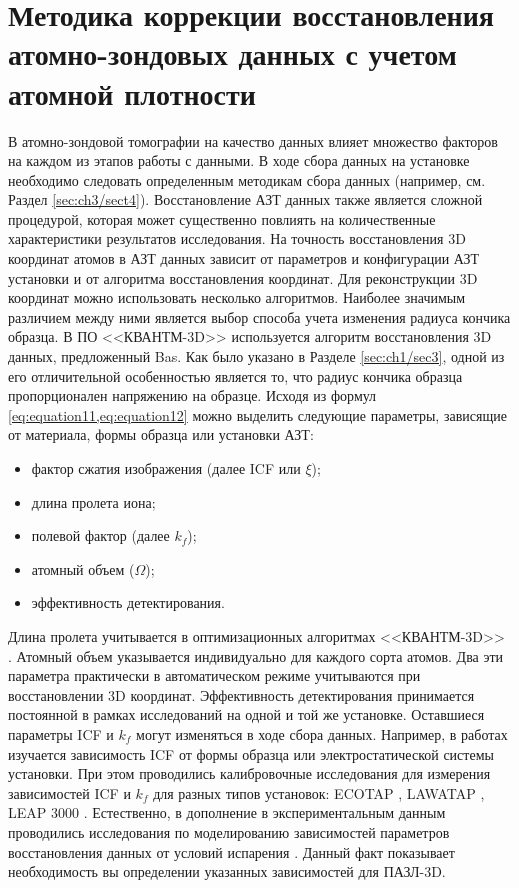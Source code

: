 \FloatBarrier

\section{Методика коррекции восстановления атомно-зондовых данных с учетом атомной плотности}\label{sec:ch3/sect5}

В атомно-зондовой томографии на качество данных влияет множество факторов на каждом из этапов работы с данными. В ходе сбора данных на установке необходимо следовать определенным методикам сбора данных (например, см. Раздел \cref{sec:ch3/sect4}). Восстановление АЗТ данных также является сложной процедурой, которая может существенно повлиять на количественные характеристики результатов исследования. На точность восстановления 3D координат атомов в АЗТ данных зависит от параметров и конфигурации АЗТ установки и от алгоритма восстановления координат. Для реконструкции 3D координат можно использовать несколько алгоритмов. Наиболее значимым различием между ними является выбор способа учета изменения радиуса кончика образца. В ПО <<КВАНТМ-3D>> используется алгоритм восстановления 3D данных, предложенный Bas. Как было указано в Разделе \cref{sec:ch1/sec3}, одной из его отличительной особенностью является то, что радиус кончика образца пропорционален напряжению на образце. Исходя из формул \cref{eq:equation11,eq:equation12} можно выделить следующие параметры, зависящие от материала, формы образца или установки АЗТ:

\begin{itemize}[beginpenalty=10000] %
	\item фактор сжатия изображения (далее ICF или $\xi$);
	\item длина пролета иона;
	\item полевой фактор (далее $k_f$);
	\item атомный объем ($\Omega$);
	\item эффективность детектирования.
\end{itemize}

Длина пролета учитывается в оптимизационных алгоритмах <<КВАНТМ-3D>> \cite{Shutov18,Shutov19}. Атомный объем указывается индивидуально для каждого сорта атомов. Два эти параметра практически в автоматическом режиме учитываются при восстановлении 3D координат. Эффективность детектирования принимается постоянной в рамках исследований на одной и той же установке. Оставшиеся параметры ICF и $k_f$ могут изменяться в ходе сбора данных. Например, в работах \cite{Geiser09,Gipson08} изучается зависимость ICF от формы образца или электростатической системы установки. При этом проводились калибровочные исследования для измерения зависимостей ICF и $k_f$ для разных типов установок: ECOTAP \cite{Geiser09}, LAWATAP \cite{Renaud03}, LEAP 3000 \cite{Renaud06}. Естественно, в дополнение в экспериментальным данным проводились исследования по моделированию зависимостей параметров восстановления данных от условий испарения \cite{Vurpillot11,Miller14,Hatzoglou19}. Данный факт показывает необходимость вы определении указанных зависимостей для ПАЗЛ-3D.



